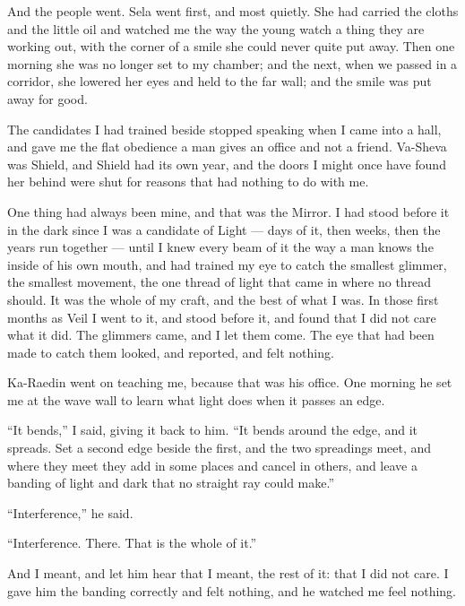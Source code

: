 And the people went. Sela went first, and most quietly. She had carried the cloths and the little oil and watched me the way the young watch a thing they are working out, with the corner of a smile she could never quite put away. Then one morning she was no longer set to my chamber; and the next, when we passed in a corridor, she lowered her eyes and held to the far wall; and the smile was put away for good. \par

The candidates I had trained beside stopped speaking when I came into a hall, and gave me the flat obedience a man gives an office and not a friend. Va-Sheva was Shield, and Shield had its own year, and the doors I might once have found her behind were shut for reasons that had nothing to do with me. \par

One thing had always been mine, and that was the Mirror. I had stood before it in the dark since I was a candidate of Light --- days of it, then weeks, then the years run together --- until I knew every beam of it the way a man knows the inside of his own mouth, and had trained my eye to catch the smallest glimmer, the smallest movement, the one thread of light that came in where no thread should. It was the whole of my craft, and the best of what I was. In those first months as Veil I went to it, and stood before it, and found that I did not care what it did. The glimmers came, and I let them come. The eye that had been made to catch them looked, and reported, and felt nothing.\par

Ka-Raedin went on teaching me, because that was his office. One morning he set me at the wave wall to learn what light does when it passes an edge.\par

``It bends,'' I said, giving it back to him. ``It bends around the edge, and it spreads. Set a second edge beside the first, and the two spreadings meet, and where they meet they add in some places and cancel in others, and leave a banding of light and dark that no straight ray could make.''\par

``Interference,'' he said.\par

``Interference. There. That is the whole of it.''\par

And I meant, and let him hear that I meant, the rest of it: that I did not care. I gave him the banding correctly and felt nothing, and he watched me feel nothing.\par

